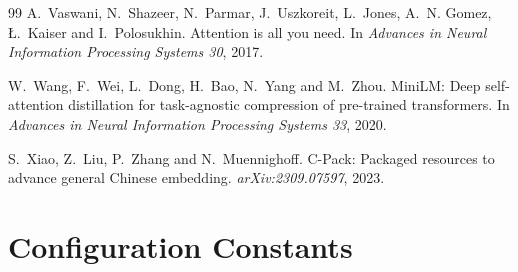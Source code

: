 \documentclass[11pt,a4paper]{article}
\theoremstyle{remark}
\begin{document}
\begin{thebibliography}{99}
A.~Vaswani, N.~Shazeer, N.~Parmar, J.~Uszkoreit, L.~Jones, A.~N. Gomez, {\L}.~Kaiser and
I.~Polosukhin.
\newblock Attention is all you need.
\newblock In \emph{Advances in Neural Information Processing Systems 30}, 2017.

W.~Wang, F.~Wei, L.~Dong, H.~Bao, N.~Yang and M.~Zhou.
\newblock MiniLM: Deep self-attention distillation for task-agnostic compression of pre-trained
transformers.
\newblock In \emph{Advances in Neural Information Processing Systems 33}, 2020.

S.~Xiao, Z.~Liu, P.~Zhang and N.~Muennighoff.
\newblock C-Pack: Packaged resources to advance general Chinese embedding.
\newblock \emph{arXiv:2309.07597}, 2023.

\end{thebibliography}

\clearpage
\appendix
\section{Configuration Constants}
\label{app:config}
\end{document}
